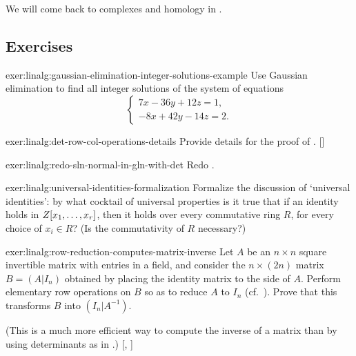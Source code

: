We will come back to complexes and homology in .

\subsection*{Exercises}

\begin{exer}{}{exer:linalg:gaussian-elimination-integer-solutions-example}
  Use Gaussian elimination to find all integer solutions of the system
  of equations
  \[
    \begin{cases}
      7x - 36y + 12z = 1, \\
      -8x + 42y - 14z = 2.
    \end{cases}
  \]
\end{exer}
\begin{exer}{\exerused}{exer:linalg:det-row-col-operations-details}
  Provide details for the proof of
  . []
\end{exer}
\begin{exer}{}{exer:linalg:redo-sln-normal-in-gln-with-det}
  Redo .
\end{exer}
\begin{exer}{}{exer:linalg:universal-identities-formalization}
  Formalize the discussion of `universal identities': by what cocktail
  of universal properties is it true that if an identity holds in
  $Z[x_1, \dots, x_r]$, then it holds over every commutative ring
  $R$, for every choice of $x_i \in R$? (Is the commutativity of $R$
  necessary?)
\end{exer}
\begin{exer}{\exerused}{exer:linalg:row-reduction-computes-matrix-inverse}
  Let $A$ be an $n \times n$ square invertible matrix with entries in
  a field, and consider the $n \times (2n)$ matrix $B = (A | I_n)$
  obtained by placing the identity matrix to the side of $A$. Perform
  elementary row operations on $B$ so as to reduce $A$ to $I_n$ (cf.\
  ). Prove
  that this transforms $B$ into $(I_n | A^{-1})$.

  (This is a much more efficient way to compute the inverse of a
  matrix than by using determinants as in
  .)
  [,
  \Cref{subsec:linalg:the-determinant}]
\end{exer}
